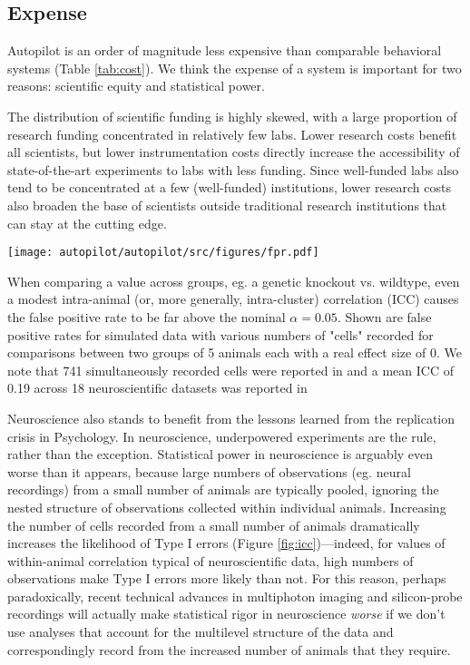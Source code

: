 \subsection{Expense}
\label{sec:expense}

Autopilot is an order of magnitude less expensive than comparable behavioral systems (Table \ref{tab:cost}). We think the expense of a system is important for two reasons: scientific equity and statistical power. 

The distribution of scientific funding is highly skewed, with a large proportion of research funding concentrated in relatively few labs\citep{katzBiomedicalEliteInequality2017}. Lower research costs benefit all scientists, but lower instrumentation costs directly increase the accessibility of state-of-the-art experiments to labs with less funding. Since well-funded labs also tend to be concentrated at a few (well-funded) institutions, lower research costs also broaden the base of scientists outside traditional research institutions that can stay at the cutting edge\citep{ashkenasEvenAffirmativeAction2017,clausetSystematicInequalityHierarchy2015,pearceExpandingEquitableAccess2019}.
\clearpage%
%
\begin{marginfigure}[0.5cm]
\texttt{[image: autopilot/autopilot/src/figures/fpr.pdf]}
\caption{When comparing a value across groups, eg. a genetic knockout vs. wildtype, even a modest intra-animal (or, more generally, intra-cluster) correlation (ICC) causes the false positive rate to be far above the nominal $\alpha = 0.05$. Shown are false positive rates for simulated data with various numbers of "cells" recorded for comparisons between two groups of 5 animals each with a real effect size of 0. We note that 741 simultaneously recorded cells were reported in \citep{junFullyIntegratedSilicon2017} and a mean ICC of 0.19 across 18 neuroscientific datasets was reported in \citep{aartsSolutionDependencyUsing2014}}
\label{fig:icc}
\end{marginfigure}%
%
Neuroscience also stands to benefit from the lessons learned from the replication crisis in Psychology\citep{shroutPsychologyScienceKnowledge2018}. In neuroscience, underpowered experiments are the rule, rather than the exception\citep{buttonPowerFailureWhy2013}. Statistical power in neuroscience is arguably even worse than it appears, because large numbers of observations (eg. neural recordings) from a small number of animals are typically pooled, ignoring the nested structure of observations collected within individual animals. Increasing the number of cells recorded from a small number of animals dramatically increases the likelihood of Type I errors (Figure \ref{fig:icc})---indeed, for values of within-animal correlation typical of neuroscientific data, high numbers of observations make Type I errors more likely than not\citep{aartsSolutionDependencyUsing2014}. For this reason, perhaps paradoxically, recent technical advances in multiphoton imaging and silicon-probe recordings will actually make statistical rigor in neuroscience \textit{worse} if we don't use analyses that account for the multilevel structure of the data and correspondingly record from the increased number of animals that they require.




